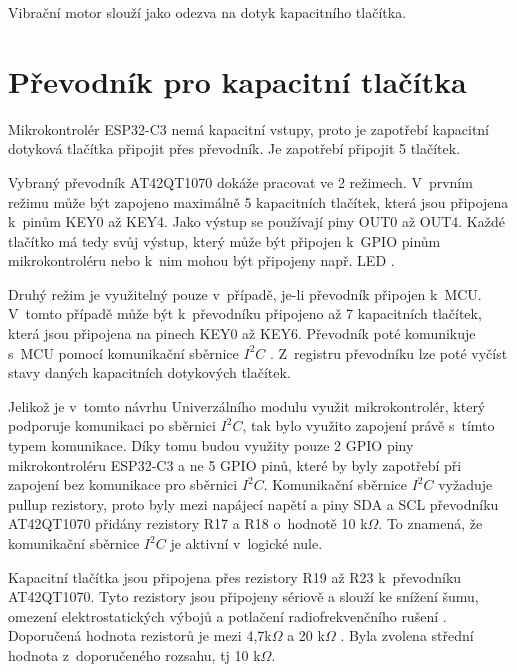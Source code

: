 Vibrační motor slouží jako odezva na dotyk kapacitního tlačítka. 

\section{Převodník pro kapacitní tlačítka}
Mikrokontrolér ESP32-C3 nemá kapacitní vstupy, proto je zapotřebí kapacitní dotyková tlačítka připojit přes převodník. Je zapotřebí připojit 
5 tlačítek. 

Vybraný převodník AT42QT1070 dokáže pracovat ve 2 režimech. V~prvním režimu může být zapojeno maximálně 5 kapacitních tlačítek, která jsou připojena
k~pinům KEY0 až KEY4. Jako výstup se používají piny OUT0 až OUT4. Každé tlačítko má tedy svůj výstup, který může být připojen k~GPIO pinům mikrokontroléru
nebo k~nim mohou být připojeny např. LED \cite{conv_cap_but_AT42QT1070_dtsh}. 

Druhý režim je využitelný pouze v~případě, je-li převodník připojen k~MCU. V~tomto případě může být k~převodníku připojeno až 7 kapacitních tlačítek, 
která jsou připojena na pinech KEY0 až KEY6. Převodník poté komunikuje s~MCU pomocí komunikační sběrnice $I^2C$ \cite{conv_cap_but_AT42QT1070_dtsh}. 
Z~registru převodníku lze poté vyčíst stavy daných kapacitních dotykových tlačítek. 

Jelikož je v~tomto návrhu Univerzálního modulu využit mikrokontrolér, který podporuje komunikaci po sběrnici $I^2C$, tak bylo využito zapojení právě s~tímto typem 
komunikace. Díky tomu budou využity pouze 2 GPIO piny mikrokontroléru ESP32-C3 a ne 5 GPIO pinů, které by byly zapotřebí při zapojení bez komunikace pro
sběrnici $I^2C$. Komunikační sběrnice $I^2C$ vyžaduje pullup rezistory, proto byly mezi napájecí napětí a piny SDA a SCL převodníku AT42QT1070 
přidány rezistory R17 a R18 o~hodnotě 10 k$\Omega$. To znamená, že komunikační sběrnice $I^2C$ je aktivní v~logické nule. 

Kapacitní tlačítka jsou připojena přes rezistory R19 až R23 k~převodníku AT42QT1070. Tyto rezistory jsou připojeny sériově a slouží ke snížení šumu, 
omezení elektrostatických výbojů a potlačení radiofrekvenčního rušení \cite{conv_cap_but_AT42QT1070_dtsh}. Doporučená hodnota rezistorů je mezi 
4,7k$\Omega$ a 20 k$\Omega$ \cite{conv_cap_but_AT42QT1070_dtsh}. Byla zvolena střední hodnota z~doporučeného rozsahu, tj 10 k$\Omega$.

